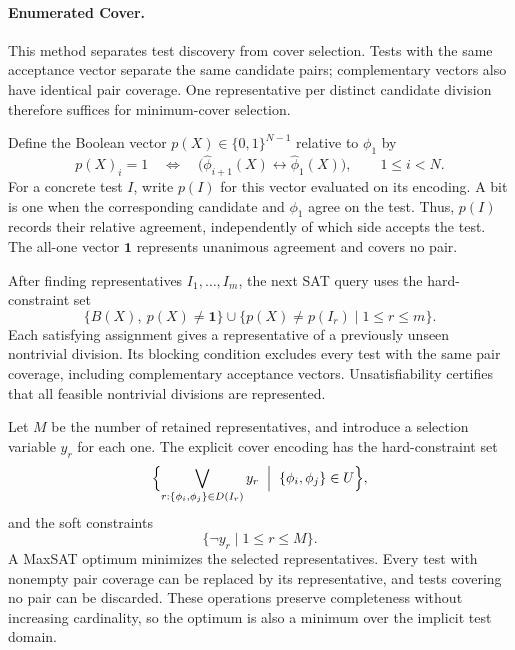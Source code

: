 \documentclass[runningheads]{llncs}
\newcommand{\methodname}[1]{\textup{\textsf{#1}}}
\newcommand{\enumeratedcover}{\methodname{Enumerated Cover}}
\begin{document}
\paragraph{\enumeratedcover{}.}
This method separates test discovery from cover selection. Tests with the
same acceptance vector separate the same candidate pairs; complementary
vectors also have identical pair coverage. One representative per distinct
candidate division therefore suffices for minimum-cover selection.

Define the Boolean vector $p(X)\in\{0,1\}^{N-1}$ relative to $\phi_1$ by
\begin{equation}
\label{eq:separation-pattern}
  p(X)_i=1\quad\Longleftrightarrow\quad
    \bigl(\widehat{\phi}_{i+1}(X)
      \leftrightarrow\widehat{\phi}_1(X)\bigr),
  \qquad 1\leq i<N.
\end{equation}
For a concrete test $I$, write $p(I)$ for this vector evaluated on its
encoding. A bit is one when the corresponding candidate and $\phi_1$ agree
on the test. Thus, $p(I)$ records their relative agreement, independently of
which side accepts the test. The all-one vector $\mathbf 1$ represents
unanimous agreement and covers no pair.

After finding representatives $I_1,\ldots,I_m$, the next SAT query uses the
hard-constraint set
\begin{equation}
\label{eq:enumeration-query}
  \{B(X),\ p(X)\neq\mathbf 1\}
    \cup\{p(X)\neq p(I_r)\mid 1\leq r\leq m\}.
\end{equation}
Each satisfying assignment gives a representative of a previously unseen
nontrivial division. Its blocking condition excludes every test with the
same pair coverage, including complementary acceptance vectors. Unsatisfiability certifies that all feasible nontrivial divisions are
represented.

Let $M$ be the number of retained representatives, and introduce a selection
variable $y_r$ for each one. The explicit cover encoding has the
hard-constraint set
\begin{equation}
\label{eq:enumerated-cover}
  \Bigl\{\bigvee_{r:\{\phi_i,\phi_j\}\in D(I_r)}y_r
    \;\Bigm|\;\{\phi_i,\phi_j\}\in U\Bigr\},
\end{equation}
and the soft constraints
\begin{equation}
\label{eq:enumerated-objective}
  \{\neg y_r\mid 1\leq r\leq M\}.
\end{equation}
A MaxSAT optimum minimizes the selected representatives. Every test with
nonempty pair coverage can be replaced by its representative, and tests
covering no pair can be discarded.
These operations preserve completeness without increasing cardinality, so
the optimum is also a minimum over the implicit test domain.
\end{document}
